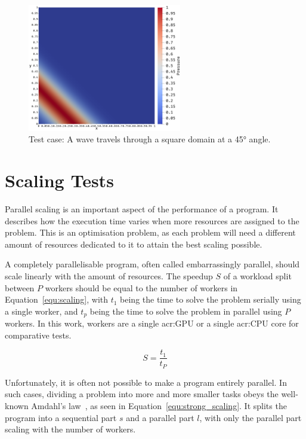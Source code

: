 \begin{figure}[H]
    \centering
    \includegraphics[width=0.6\textwidth]{Chapter_results/media/problem_1}
    \caption{Test case: A wave travels through a square domain at a 45° angle.}\label{fig:problem}
\end{figure}

\section{Scaling Tests}\label{section:results:scaling_tests}

Parallel scaling is an important aspect of the performance of a program. It describes how the
execution time varies when more resources are assigned to the problem. This is an optimisation
problem, as each problem will need a different amount of resources dedicated to it to attain the
best scaling possible.

A completely parallelisable program, often called embarrassingly parallel, should scale linearly
with the amount of resources. The speedup \(S\) of a workload split between \(P\) workers should be
equal to the number of workers in Equation~\ref{equ:scaling}, with \(t_1\) being the time to solve
the problem serially using a single worker, and \(t_p\) being the time to solve the problem in
parallel using \(P\) workers. In this work, workers are a single \acrshort{acr:GPU} or a single
\acrshort{acr:CPU} core for comparative tests.

\begin{equation} \label{equ:scaling}
    S = \frac{t_1}{t_P}
\end{equation}

Unfortunately, it is often not possible to make a program entirely parallel. In such cases, dividing
a problem into more and more smaller tasks obeys the well-known Amdahl's law~\cite{Amdahl1967}, as
seen in Equation~\ref{equ:strong_scaling}. It splits the program into a sequential part \(s\) and a
parallel part \(l\), with only the parallel part scaling with the number of workers.

